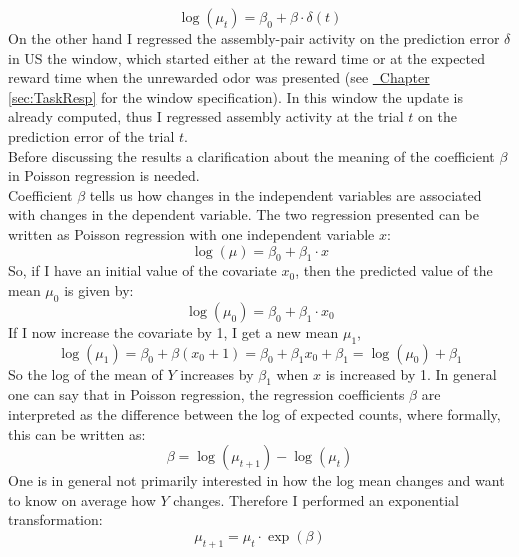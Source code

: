 \begin{equation}
    \log(\mu_t)=\beta_0+\beta\cdot\delta(t)
    \label{eq:regrDelta}
\end{equation}
On the other hand I regressed the assembly-pair activity on the prediction error $\delta$ in US the window, which started either at the reward time or at the expected reward time when the unrewarded odor was presented (see \hyperref[sec:TaskResp]{~Chapter \ref*{sec:TaskResp}} for the window specification). In this window the update is already computed, thus I regressed assembly activity at the trial $t$ on the prediction error of the trial $t$.\\
Before discussing the results a clarification about the meaning of the coefficient $\beta$ in Poisson regression is needed.\\
Coefficient $\beta$ tells us how changes in the independent variables are associated with changes in the dependent variable.
The two regression presented can be written as Poisson regression with one independent variable $x$:
\begin{equation}
    \log(\mu)=\beta_0+\beta_1\cdot x
    \label{eq:betaCoeff}
\end{equation}
So, if I have an initial value of the covariate $x_0$, then the predicted value of the mean $\mu_0$ is given by:
\begin{equation*}
    \log(\mu_0)=\beta_0+\beta_1\cdot x_0
    \label{eq:betaCoeff0}
\end{equation*}
If I now increase the covariate by 1, I get a new mean $\mu_1$,
\begin{equation*}
    \log(\mu_1)=\beta_0+\beta(x_0+1)=\beta_0+\beta_1x_0+\beta_1=\log(\mu_0)+\beta_1
    \label{eq:betaCoeff1}
\end{equation*}
So the log of the mean of $Y$ increases by $\beta_1$ when $x$ is increased by 1.
In general one can say that in Poisson regression, the regression coefficients $\beta$ are interpreted as the difference between the log of expected counts, where formally, this can be written as:
\begin{equation}
    \beta=\log(\mu_{t+1})-\log(\mu_t)
    \label{eq:BetaRelLog}
\end{equation}
One is in general not primarily interested in how the log mean changes and want to know on average how $Y$ changes. Therefore I performed an exponential transformation:
\begin{equation}
    \mu_{t+1}=\mu_t\cdot \exp(\beta)
    \label{eq:BetaRelExp}
\end{equation}
